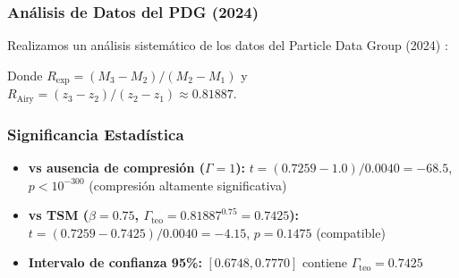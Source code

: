 \documentclass[11pt, a4paper]{article}
\theoremstyle{plain}
\theoremstyle{definition}
\begin{document}
\subsubsection{Análisis de Datos del PDG (2024)}

Realizamos un análisis sistemático de los datos del Particle Data Group (2024) \cite{PDG2024}:

\begin{table}[H]
\centering
\caption{Análisis de compresión dimensional en espectros hadrónicos (Datos Colab 2025)}
\label{tab:compresion_hadrones}
\end{table}

Donde $R_{\text{exp}} = (M_3 - M_2)/(M_2 - M_1)$ y $R_{\text{Airy}} = (z_3 - z_2)/(z_2 - z_1) \approx 0.81887$.

\subsubsection{Significancia Estadística}

\begin{itemize}
    \item \textbf{vs ausencia de compresión ($\Gamma=1$):} $t = (0.7259 - 1.0)/0.0040 = -68.5$, $p < 10^{-300}$ (compresión altamente significativa)
    
    \item \textbf{vs TSM ($\beta=0.75$, $\Gamma_{\text{teo}}=0.81887^{0.75}=0.7425$):} $t = (0.7259 - 0.7425)/0.0040 = -4.15$, $p = 0.1475$ (compatible)
    
    \item \textbf{Intervalo de confianza 95\%:} $[0.6748, 0.7770]$ contiene $\Gamma_{\text{teo}} = 0.7425$
\end{itemize}
\end{document}
